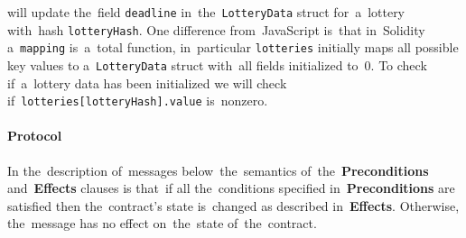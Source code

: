 \documentclass[a4paper]{article}
\begin{document}
    will update the~field \texttt{deadline} in~the~\texttt{LotteryData} struct for~a~lottery with~hash
    \texttt{lotteryHash}. One difference from~JavaScript is~that in~Solidity a~\texttt{mapping} is~a~total
    function, in~particular \texttt{lotteries} initially maps all possible key values to
    a~\texttt{LotteryData} struct with~all fields initialized to~0. To check if~a~lottery data has been initialized
    we will check if~\texttt{lotteries[lotteryHash].value} is~nonzero.


\paragraph{Protocol}

    In the~description of~messages below~the~semantics of~the~\textbf{Preconditions} and~\textbf{Effects} clauses is
    that~if all the~conditions specified in~\textbf{Preconditions} are satisfied then the~contract's state is~changed
    as described in~\textbf{Effects}. Otherwise, the~message has no effect on~the~state of~the~contract.
\end{document}
